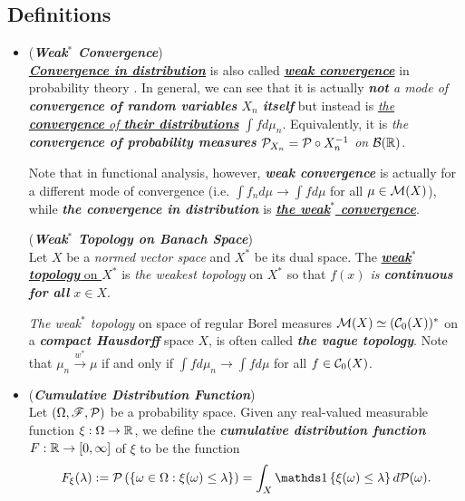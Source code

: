 \documentclass[11pt]{article}
\begin{document}
\subsection{Definitions}
\begin{itemize}
\item \begin{remark} (\emph{\textbf{Weak$^{*}$ Convergence}})\\
\underline{\emph{\textbf{Convergence in distribution}}} is also called \underline{\emph{\textbf{weak convergence}}} in probability theory \citep{folland2013real}. In general, we can see that it is actually \emph{\textbf{not} a mode of \textbf{convergence of random variables} $X_n$ \textbf{itself}} but instead is \underline{\emph{the \textbf{convergence} of \textbf{their distributions}}} $\int f d\mu_n$. Equivalently, it is \emph{the \textbf{convergence of probability measures} ${\mathcal P}_{X_n} = {\mathcal P} \circ X_n^{-1}$ on ${\mathcal B}({\mathbb R})$}.

Note that in functional analysis, however, \emph{\textbf{weak convergence}} is actually for a different mode of convergence (i.e. $\int f_n d\mu \rightarrow \int f d\mu$ for all $\mu \in {\mathcal M}(X)$), while \emph{\textbf{the convergence in distribution}} is \underline{\emph{\textbf{the weak$^*$ convergence}}}.

 \begin{definition}  (\textbf{\emph{Weak$^{*}$ Topology on Banach Space}})\\
Let $X$ be a \emph{normed vector space} and $X^{*}$ be its dual space. The \underline{\emph{\textbf{weak$^{*}$ topology}} on $X^{*}$} is \emph{the weakest topology} on $X^{*}$ so that \emph{$f(x)$ is \textbf{continuous} \textbf{for all} $x \in X$}.
\end{definition}

\emph{The weak$^{*}$ topology} on space of regular Borel measures ${\mathcal M}(X) \simeq ({\mathcal C}_{0}(X))^{*}$ on a \emph{\textbf{compact Hausdorff}} space $X$, is often called \emph{\textbf{the vague topology}}. Note that $\mu_n \stackrel{w^{*}}{\rightarrow} \mu$ if and only if $\int f d\mu_n \rightarrow \int f d\mu$ for all $f \in {\mathcal C}_0(X)$. 
\end{remark}

\item
\begin{definition} (\emph{\textbf{Cumulative Distribution Function}}) \citep{van2000asymptotic} \\
Let $(\Omega,{\mathscr F}, {\mathcal P})$ be a probability space. Given any real-valued measurable function $\xi : \Omega \rightarrow {\mathbb R}$, we define the \emph{\textbf{cumulative distribution function}} $F : {\mathbb R} \rightarrow [0, \infty]$ of $\xi$ to be the function
\begin{align*}
F_{\xi}(\lambda) :=  \cP\paren{\set{\omega \in  \Omega : \xi(\omega) \le \lambda}} = \int_{X} \ind{\xi(\omega) \le \lambda}d\cP(\omega).
\end{align*}
\end{definition}


\end{itemize}
\end{document}
